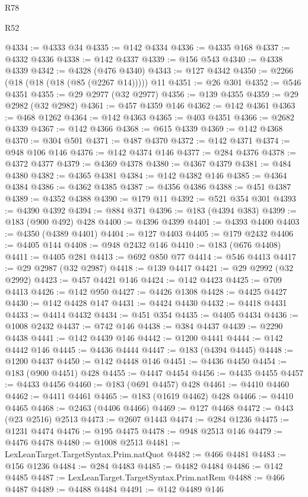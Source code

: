 \begin{lexlean}{R78}
\begin{lexlean}{R52}
\begin{coremodule}
{{{{{{{{{{{{{{{{{{{{{{{{{{{{{{{{{{{{{{{{{{{{{{{{{{{{{{{{{{{{{{{{{{{{{{{{{{{{{{{{{{{{{{{{{{{{{{{{{{{{{{{{{{{{{{{{{{{{{{{{{{{{{{{{{{{{{{{{{{{{{{{{{{{{{{{{{{{{{{{{{{{{{{{{{{{{{{{{{{{{{{{{{{{{{{{{{{{{{{@4334 := @4333 @34
@4335 := @142 @4334
@4336 := @4335 @168
@4337 := @4332 @4336
@4338 := @142 @4337
@4339 := @156 @543
@4340 := @4338 @4339
@4342 := @4328 (@476 @4340)
@4343 := @127 @4342
@4350 := @2266 (@18 (@18 (@18 (@85 (@2267 @14))))) @11
@4351 := @26 @301
@4352 := @546 @4351
@4355 := @29 @2977 (@32 @2977)
@4356 := @139 @4355
@4359 := @29 @2982 (@32 @2982)
@4361 := @457 @4359 @146
@4362 := @142 @4361
@4363 := @468 @1262
@4364 := @142 @4363
@4365 := @403 @4351
@4366 := @2682 @4339
@4367 := @142 @4366
@4368 := @615 @4339
@4369 := @142 @4368
@4370 := @304 @501
@4371 := @487 @4370
@4372 := @142 @4371
@4374 := @948 @106 @146
@4376 := @142 @4374 @146
@4377 := @284 @4376
@4378 := @4372 @4377
@4379 := @4369 @4378
@4380 := @4367 @4379
@4381 := @484 @4380
@4382 := @4365 @4381
@4384 := @142 @4382 @146
@4385 := @4364 @4384
@4386 := @4362 @4385
@4387 := @4356 @4386
@4388 := @451 @4387
@4389 := @4352 @4388
@4390 := @179 @11
@4392 := @521 @354 @301
@4393 := @4390 @4392
@4394 := @884 @371
@4396 := @183 (@4394 @383)
@4399 := @183 (@900 @492) @428
@4400 := @4396 @4399
@4401 := @4393 @4400
@4403 := @4350 (@4389 @4401)
@4404 := @127 @4403
@4405 := @179 @2432
@4406 := @4405 @144
@4408 := @948 @2432 @146
@4410 := @183 (@676 @4408)
@4411 := @4405 @281
@4413 := @692 @850 @77
@4414 := @546 @4413
@4417 := @29 @2987 (@32 @2987)
@4418 := @139 @4417
@4421 := @29 @2992 (@32 @2992)
@4423 := @457 @4421 @146
@4424 := @142 @4423
@4425 := @709 @4413
@4426 := @142 @950
@4427 := @4426 @1308
@4428 := @4425 @4427
@4430 := @142 @4428 @147
@4431 := @4424 @4430
@4432 := @4418 @4431
@4433 := @4414 @4432
@4434 := @451 @354
@4435 := @4405 @4434
@4436 := @1008 @2432
@4437 := @742 @146
@4438 := @384 @4437
@4439 := @2290 @4438
@4441 := @142 @4439 @146
@4442 := @1200 @4441
@4444 := @142 @4442 @146
@4445 := @4436 @4444
@4447 := @183 (@4394 @4445)
@4448 := @1200 @4437
@4450 := @142 @4448 @146
@4451 := @4436 @4450
@4454 := @183 (@900 @4451) @428
@4455 := @4447 @4454
@4456 := @4435 @4455
@4457 := @4433 @4456
@4460 := @183 (@691 @4457) @428
@4461 := @4410 @4460
@4462 := @4411 @4461
@4465 := @183 (@1619 @4462) @428
@4466 := @4410 @4465
@4468 := @2463 (@4406 @4466)
@4469 := @127 @4468
@4472 := @443 (@23 @2516) @2513
@4473 := @2607 @1443
@4474 := @284 @1236
@4475 := @1231 @4474
@4476 := @195 @4475
@4478 := @948 @2513 @146
@4479 := @4476 @4478
@4480 := @1008 @2513
@4481 := LexLeanTarget.TargetSyntax.Prim.natQuot
@4482 := @466 @4481
@4483 := @156 @1236
@4484 := @284 @4483
@4485 := @4482 @4484
@4486 := @142 @4485
@4487 := LexLeanTarget.TargetSyntax.Prim.natRem
@4488 := @466 @4487
@4489 := @4488 @4484
@4491 := @142 @4489 @146
}}}}}}}}}}}}}}}}}}}}}}}}}}}}}}}}}}}}}}}}}}}}}}}}}}}}}}}}}}}}}}}}}}}}}}}}}}}}}}}}}}}}}}}}}}}}}}}}}}}}}}}}}}}}}}}}}}}}}}}}}}}}}}}}}}}}}}}}}}}}}}}}}}}}}}}}}}}}}}}}}}}}}}}}}}}}}}}}}}}}}}}}}}}}}}}}}}}}}}
\end{coremodule}
\end{lexlean}
\end{lexlean}
